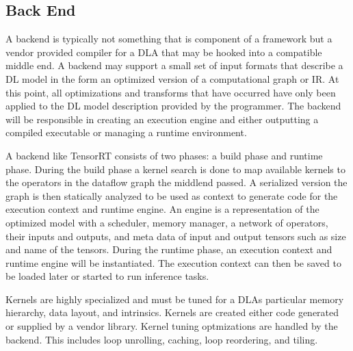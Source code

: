 \subsection{Back End}
A backend is typically not something that is component of a framework
but a vendor provided compiler for a DLA that may be hooked into a compatible
middle end. A backend may support a small set of input formats that describe
a DL model in the form an optimized version of a computational graph or IR.
At this point, all optimizations and transforms that have occurred have
only been applied to the DL model description provided by the programmer.
The backend will be responsible in creating
an execution engine and either outputting a compiled executable or managing
a runtime environment.

A backend like TensorRT \cite{tensorRT} consists of two phases: a build phase
and runtime phase. During the build phase a kernel search is done to map
available kernels to the operators in the dataflow graph the middlend passed. A
serialized version the graph is then statically analyzed to be used as context
to generate code for the execution context and runtime engine.  An engine is a
representation of the optimized model with a scheduler, memory manager, a
network of operators, their inputs and outputs, and meta data of input and
output tensors such as size and name of the tensors.  During the runtime phase,
an execution context and runtime engine will be instantiated. The execution
context can then be saved to be loaded later or started to run inference tasks.

Kernels are highly specialized and must be tuned for a DLAs particular memory
hierarchy, data layout, and intrinsics. Kernels are created either code
generated or supplied by a vendor library. Kernel tuning optmizations are
handled by the backend.  This includes loop unrolling, caching, loop
reordering, and tiling.

